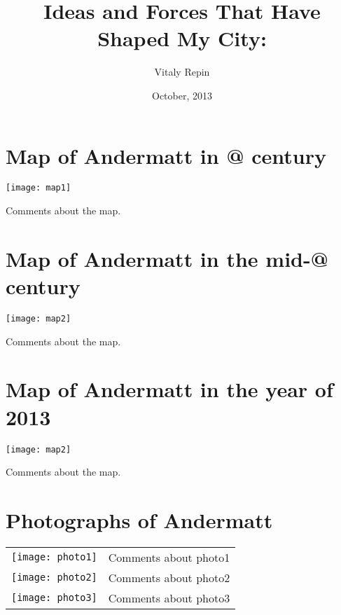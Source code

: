\documentclass[a4paper]{article}
\author{Vitaly Repin}
\title{Ideas and Forces That Have Shaped My City: \emph{\mycity}}
\date{October, 2013}
\makeatletter
\newcommand*{\rom}[1]{\expandafter\@slowromancap\romannumeral #1@\xspace}
\newcommand{\mycity}{Andermatt\xspace}
\makeatother
\begin{document}

\section{Map of \mycity in \rom{19} century}
\texttt{[image: map1]}

Comments about the map.

\newpage

\section{Map of \mycity in the mid-\rom{20} century}
\texttt{[image: map2]}

Comments about the map.

\newpage

\section{Map of \mycity in the year of 2013}
\texttt{[image: map2]}

Comments about the map.

\newpage

\section{Photographs of \mycity}
\begin{tabular}{lp{}}
\texttt{[image: photo1]} & Comments about photo1\\[.2cm]
\texttt{[image: photo2]} & Comments about photo2\\[.2cm]
\texttt{[image: photo3]} & Comments about photo3\\
\end{tabular}
\end{document}
